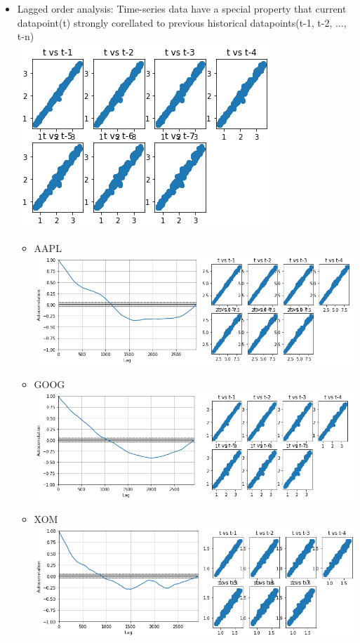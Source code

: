\documentclass[11pt]{article}
\makeatletter
\def\maxwidth{\ifdim\Gin@nat@width>\linewidth\linewidth
    \else\Gin@nat@width\fi}
\let\Oldincludegraphics\includegraphics
\renewcommand{\includegraphics}[1]{\Oldincludegraphics[width=.8\maxwidth]{#1}}
\makeatother
\begin{document}
\begin{itemize}
\item
  Lagged order analysis: Time-series data have a special property that
  current datapoint(t) strongly corellated to previous historical
  datapoints(t-1, t-2, ..., t-n) \\
  \includegraphics{./figures/8.jpg}

  \begin{itemize}
  \item
    AAPL \\
    \includegraphics{./figures/19.jpg}
  \item
    GOOG \\
    \includegraphics{./figures/22.jpg}
  \item
    XOM \\ 
    \includegraphics{./figures/25.jpg}
  \end{itemize}
\end{itemize}
\end{document}
